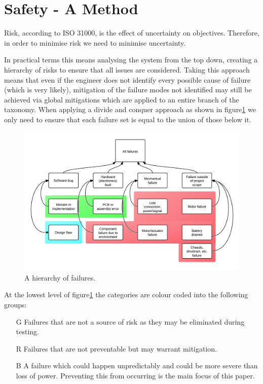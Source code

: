 \section{Safety - A Method}
Risk, according to ISO 31000\cite{ISO31000}, is the effect of uncertainty on objectives. 
Therefore, in order to minimise risk we need to minimise uncertainty. 

In practical terms this means analysing the system from the top down,
creating a hierarchy of risks to ensure that all issues are considered. 
Taking this approach means that even if the engineer does not identify
every possible cause of failure (which is very likely), mitigation of the
failure modes not identified may still be achieved via global mitigations 
which are applied to an entire branch of the taxonomy. 
When applying a divide and conquer approach as shown in figure\ref{FailTree} we only need
to ensure that each failure set is equal to the union of those below it.

\begin{figure}[!ht]
  \caption{A hierarchy of failures.}
  \label{FailTree}
  \centering
    \includegraphics[width=\textwidth]{FailTree}
\end{figure}

At the lowest level of figure\ref{FailTree} the categories are colour coded into the following groups:

\begin{itemize}
\item[G] Failures that are not a source of risk as they may be eliminated
during testing.
\item[R] Failures that are not preventable but may warrant mitigation.
\item[B] A failure which could happen unpredictably and could be more severe
than loss of power. Preventing this from occurring is the main focus of this paper.
\end{itemize}

